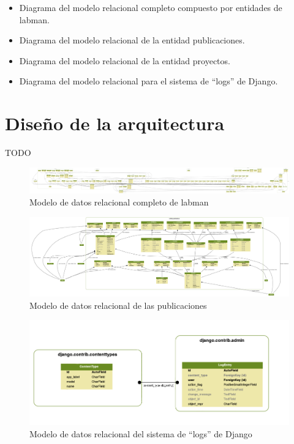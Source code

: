 \begin{itemize}
	\item Diagrama del modelo relacional completo compuesto por entidades de \acrshort{labman}.
	\item Diagrama del modelo relacional de la entidad publicaciones.
	\item Diagrama del modelo relacional de la entidad proyectos.
	\item Diagrama del modelo relacional para el sistema de ``logs'' de Django.
\end{itemize}

\section{Diseño de la arquitectura}

TODO

\begin{figure}[!htbp]
	\centering
	\includegraphics[angle=90, scale=0.072]{fig/dbmodel/labman_model}
	\caption{Modelo de datos relacional completo de \acrshort{labman}}
	\label{fig:labmanmodel}
\end{figure}

\begin{figure}[!htbp]
	\centering
	\includegraphics[angle=90, scale=0.17]{fig/dbmodel/publications}
	\caption{Modelo de datos relacional de las publicaciones}
	\label{fig:publicationsmodel}
\end{figure}

\begin{figure}[!htbp]
	\centering
	\includegraphics[scale=0.45]{fig/dbmodel/django_log}
	\caption{Modelo de datos relacional del sistema de ``logs'' de Django}
	\label{fig:logsmodel}
\end{figure}

